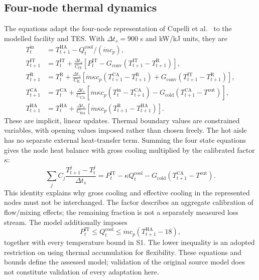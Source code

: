 \subsection{Four-node thermal dynamics}
The equations adapt the four-node representation of Cupelli et al.~\cite{cupelli2018data} to the modelled facility and TES. With $\Delta t_s=900$ s and kW/kJ units, they are
\begin{align}
T_t^{\mathrm{in}}&=T_{t+1}^{\mathrm{HA}}-Q_t^{\mathrm{cool}}/(\dot m c_p),\\
T_{t+1}^{\mathrm{IT}}&=T_t^{\mathrm{IT}}+\frac{\Delta t_s}{C_{\mathrm{IT}}}
\left[P_t^{\mathrm{IT}}-G_{\mathrm{conv}}(T_{t+1}^{\mathrm{IT}}-T_{t+1}^{\mathrm R})\right],\\
T_{t+1}^{\mathrm R}&=T_t^{\mathrm R}+\frac{\Delta t_s}{C_{\mathrm R}}
\left[\dot m\kappa c_p(T_{t+1}^{\mathrm{CA}}-T_{t+1}^{\mathrm R})+
G_{\mathrm{conv}}(T_{t+1}^{\mathrm{IT}}-T_{t+1}^{\mathrm R})\right],\\
T_{t+1}^{\mathrm{CA}}&=T_t^{\mathrm{CA}}+\frac{\Delta t_s}{C_{\mathrm{CA}}}
\left[\dot m\kappa c_p(T_t^{\mathrm{in}}-T_{t+1}^{\mathrm{CA}})
-G_{\mathrm{cold}}(T_{t+1}^{\mathrm{CA}}-T^{\mathrm{out}})\right],\\
T_{t+1}^{\mathrm{HA}}&=T_t^{\mathrm{HA}}+\frac{\Delta t_s}{C_{\mathrm{HA}}}
\left[\dot m\kappa c_p(T_{t+1}^{\mathrm R}-T_{t+1}^{\mathrm{HA}})\right].
\end{align}
These are implicit, linear updates. Thermal boundary values are constrained variables, with opening values imposed rather than chosen freely. The hot aisle has no separate external heat-transfer term. Summing the four state equations gives the node heat balance with gross cooling multiplied by the calibrated factor $\kappa$:
\begin{equation}
\sum_j C_j\frac{T_{t+1}^j-T_t^j}{\Delta t_s}
=P_t^{\mathrm{IT}}-\kappa Q_t^{\mathrm{cool}}
-G_{\mathrm{cold}}(T_{t+1}^{\mathrm{CA}}-T^{\mathrm{out}}).
\end{equation}
This identity explains why gross cooling and effective cooling in the represented nodes must not be interchanged. The factor describes an aggregate calibration of flow/mixing effects; the remaining fraction is not a separately measured loss stream. The model additionally imposes
\begin{equation}
P_t^{\mathrm{IT}}\leq Q_t^{\mathrm{cool}}\leq
\dot m c_p(T_{t+1}^{\mathrm{HA}}-18),
\end{equation}
together with every temperature bound in S1. The lower inequality is an adopted restriction on using thermal accumulation for flexibility. These equations and bounds define the assessed model; validation of the original source model does not constitute validation of every adaptation here.

